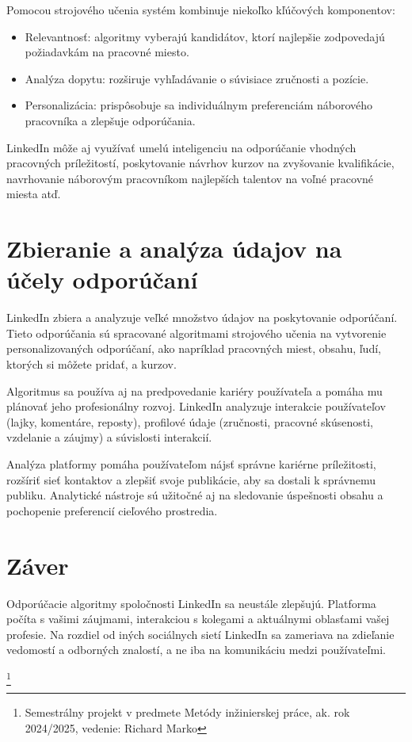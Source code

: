 \documentclass[twoside,slovak,a4paper]{coursepaper}
\begin{document}
Pomocou strojového učenia systém kombinuje niekoľko kľúčových komponentov:
\begin{itemize}
	\item Relevantnosť: algoritmy vyberajú kandidátov, ktorí najlepšie zodpovedajú požiadavkám na pracovné miesto.
	\item Analýza dopytu: rozširuje vyhľadávanie o súvisiace zručnosti a pozície.
	\item Personalizácia: prispôsobuje sa individuálnym preferenciám náborového pracovníka a zlepšuje odporúčania.
	
  \end{itemize}

LinkedIn môže aj využívať umelú inteligenciu na odporúčanie vhodných pracovných príležitostí, poskytovanie návrhov kurzov na zvyšovanie kvalifikácie, navrhovanie náborovým pracovníkom najlepších talentov na voľné pracovné miesta atď.~\cite{Mangla:article}


\section{Zbieranie a analýza údajov na účely odporúčaní} \label{analýza údajov}
LinkedIn zbiera a analyzuje veľké množstvo údajov na poskytovanie odporúčaní. Tieto odporúčania sú spracované algoritmami strojového učenia na vytvorenie personalizovaných odporúčaní, ako napríklad pracovných miest, obsahu, ľudí, ktorých si môžete pridať, a kurzov.

Algoritmus sa používa aj na predpovedanie kariéry používateľa a pomáha mu plánovať jeho profesionálny rozvoj. LinkedIn analyzuje interakcie používateľov (lajky, komentáre, reposty), profilové údaje (zručnosti, pracovné skúsenosti, vzdelanie a záujmy) a súvislosti interakcií.~\cite{Bano:article}

Analýza platformy pomáha používateľom nájsť správne kariérne príležitosti, rozšíriť sieť kontaktov a zlepšiť svoje publikácie, aby sa dostali k správnemu publiku. Analytické nástroje sú užitočné aj na sledovanie úspešnosti obsahu a pochopenie preferencií cieľového prostredia.

\section{Záver} \label{zaver}
Odporúčacie algoritmy spoločnosti LinkedIn sa neustále zlepšujú. Platforma počíta s vašimi záujmami, interakciou s kolegami a aktuálnymi oblasťami vašej profesie. Na rozdiel od iných sociálnych sietí LinkedIn sa zameriava na zdieľanie vedomostí a odborných znalostí, a ne iba na komunikáciu medzi používateľmi.

\thanks{Semestrálny projekt v predmete Metódy inžinierskej práce, ak. rok 2024/2025, vedenie: Richard Marko}


 
\end{document}
